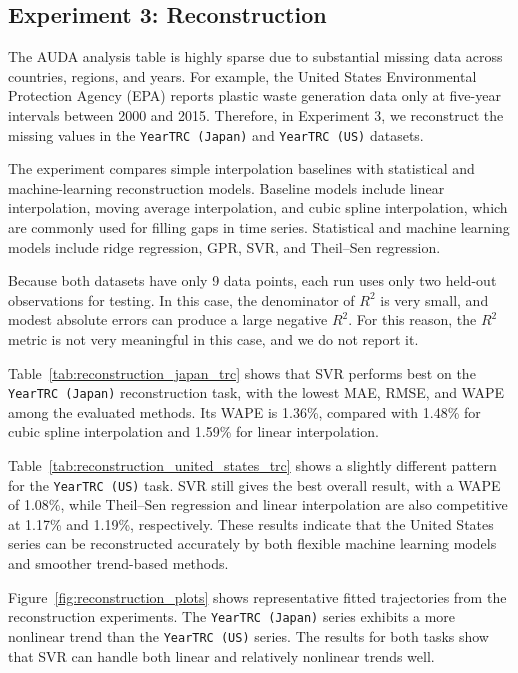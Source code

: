 \subsection{Experiment 3: Reconstruction}

The AUDA analysis table is highly sparse due to substantial missing data across countries, regions, and years. For example, the United States Environmental Protection Agency (EPA) reports plastic waste generation data only at five-year intervals between 2000 and 2015. Therefore, in Experiment 3, we reconstruct the missing values in the \texttt{YearTRC (Japan)} and \texttt{YearTRC (US)} datasets.

The experiment compares simple interpolation baselines with statistical and machine-learning reconstruction models. Baseline models include linear interpolation, moving average interpolation, and cubic spline interpolation, which are commonly used for filling gaps in time series. Statistical and machine learning models include ridge regression, GPR, SVR, and Theil--Sen regression.

Because both datasets have only 9 data points, each run uses only two held-out observations for testing. In this case, the denominator of \(R^2\) is very small, and modest absolute errors can produce a large negative \(R^2\). For this reason, the \(R^2\) metric is not very meaningful in this case, and we do not report it.





Table~\ref{tab:reconstruction_japan_trc} shows that SVR performs best on the \texttt{YearTRC (Japan)} reconstruction task, with the lowest MAE, RMSE, and WAPE among the evaluated methods. Its WAPE is 1.36\%, compared with 1.48\% for cubic spline interpolation and 1.59\% for linear interpolation.

Table~\ref{tab:reconstruction_united_states_trc} shows a slightly different pattern for the \texttt{YearTRC (US)} task. SVR still gives the best overall result, with a WAPE of 1.08\%, while Theil--Sen regression and linear interpolation are also competitive at 1.17\% and 1.19\%, respectively. These results indicate that the United States series can be reconstructed accurately by both flexible machine learning models and smoother trend-based methods.

Figure~\ref{fig:reconstruction_plots} shows representative fitted trajectories from the reconstruction experiments. The \texttt{YearTRC (Japan)} series exhibits a more nonlinear trend than the \texttt{YearTRC (US)} series. The results for both tasks show that SVR can handle both linear and relatively nonlinear trends well.
